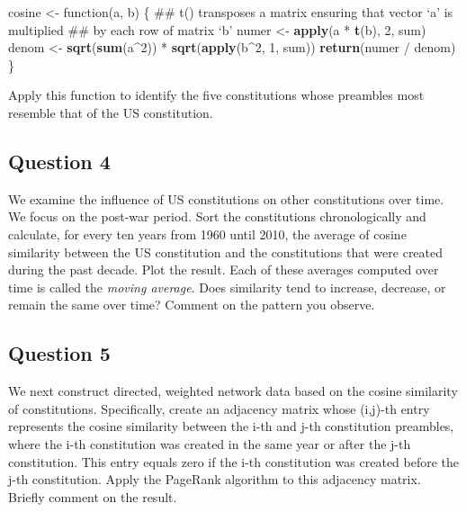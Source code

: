 \documentclass[]{article}
\newenvironment{Shaded}{\begin{snugshade}}{\end{snugshade}}
\newcommand{\KeywordTok}[1]{\textcolor[rgb]{0.13,0.29,0.53}{\textbf{{#1}}}}
\newcommand{\DecValTok}[1]{\textcolor[rgb]{0.00,0.00,0.81}{{#1}}}
\newcommand{\StringTok}[1]{\textcolor[rgb]{0.31,0.60,0.02}{{#1}}}
\newcommand{\NormalTok}[1]{{#1}}
\begin{document}
\begin{Shaded}
\begin{Highlighting}[]
\NormalTok{cosine <-}\StringTok{ }\NormalTok{function(a, b) \{}
    \NormalTok{## t() transposes a matrix ensuring that vector `a' is multiplied }
    \NormalTok{## by each row of matrix `b'}
    \NormalTok{numer <-}\StringTok{ }\KeywordTok{apply}\NormalTok{(a *}\StringTok{ }\KeywordTok{t}\NormalTok{(b), }\DecValTok{2}\NormalTok{, sum) }
    \NormalTok{denom <-}\StringTok{ }\KeywordTok{sqrt}\NormalTok{(}\KeywordTok{sum}\NormalTok{(a^}\DecValTok{2}\NormalTok{)) *}\StringTok{ }\KeywordTok{sqrt}\NormalTok{(}\KeywordTok{apply}\NormalTok{(b^}\DecValTok{2}\NormalTok{, }\DecValTok{1}\NormalTok{, sum))}
    \KeywordTok{return}\NormalTok{(numer /}\StringTok{ }\NormalTok{denom)}
\NormalTok{\}}
\end{Highlighting}
\end{Shaded}

Apply this function to identify the five constitutions whose preambles
most resemble that of the US constitution.

\subsection{Question 4}\label{question-4}

We examine the influence of US constitutions on other constitutions over
time. We focus on the post-war period. Sort the constitutions
chronologically and calculate, for every ten years from 1960 until 2010,
the average of cosine similarity between the US constitution and the
constitutions that were created during the past decade. Plot the result.
Each of these averages computed over time is called the \emph{moving
average}. Does similarity tend to increase, decrease, or remain the same
over time? Comment on the pattern you observe.

\subsection{Question 5}\label{question-5}

We next construct directed, weighted network data based on the cosine
similarity of constitutions. Specifically, create an adjacency matrix
whose (i,j)-th entry represents the cosine similarity between the i-th
and j-th constitution preambles, where the i-th constitution was created
in the same year or after the j-th constitution. This entry equals zero
if the i-th constitution was created before the j-th constitution. Apply
the PageRank algorithm to this adjacency matrix. Briefly comment on the
result.
\end{document}
